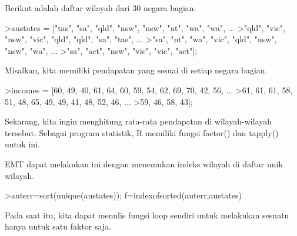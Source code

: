 \documentclass[a4paper,10pt]{article}
\begin{document}
\begin{eulernotebook}
\begin{eulercomment}
\begin{eulercomment}
\begin{eulercomment}
\begin{eulercomment}
\begin{eulercomment}
Berikut adalah daftar wilayah dari 30 negara bagian.
\end{eulercomment}
\begin{eulerprompt}
>austates = ["tas", "sa", "qld", "nsw", "nsw", "nt", "wa", "wa", ...
>"qld", "vic", "nsw", "vic", "qld", "qld", "sa", "tas", ...
>"sa", "nt", "wa", "vic", "qld", "nsw", "nsw", "wa", ...
>"sa", "act", "nsw", "vic", "vic", "act"];
\end{eulerprompt}
\begin{eulercomment}
Misalkan, kita memiliki pendapatan yang sesuai di setiap negara
bagian.
\end{eulercomment}
\begin{eulerprompt}
>incomes = [60, 49, 40, 61, 64, 60, 59, 54, 62, 69, 70, 42, 56, ...
>61, 61, 61, 58, 51, 48, 65, 49, 49, 41, 48, 52, 46, ...
>59, 46, 58, 43];
\end{eulerprompt}
\begin{eulercomment}
Sekarang, kita ingin menghitung rata-rata pendapatan di
wilayah-wilayah tersebut. Sebagai program statistik, R memiliki fungsi
factor() dan tapply() untuk ini.

EMT dapat melakukan ini dengan menemukan indeks wilayah di daftar unik
wilayah.
\end{eulercomment}
\begin{eulerprompt}
>auterr=sort(unique(austates)); f=indexofsorted(auterr,austates)
\end{eulerprompt}
\begin{euleroutput}
  [6,  5,  4,  2,  2,  3,  8,  8,  4,  7,  2,  7,  4,  4,  5,  6,  5,  3,
  8,  7,  4,  2,  2,  8,  5,  1,  2,  7,  7,  1]
\end{euleroutput}
\begin{eulercomment}
Pada saat itu, kita dapat menulis fungsi loop sendiri untuk melakukan
sesuatu hanya untuk satu faktor saja.


\end{eulercomment}
\end{eulercomment}
\end{eulercomment}
\end{eulercomment}
\end{eulercomment}
\end{eulernotebook}
\end{document}
